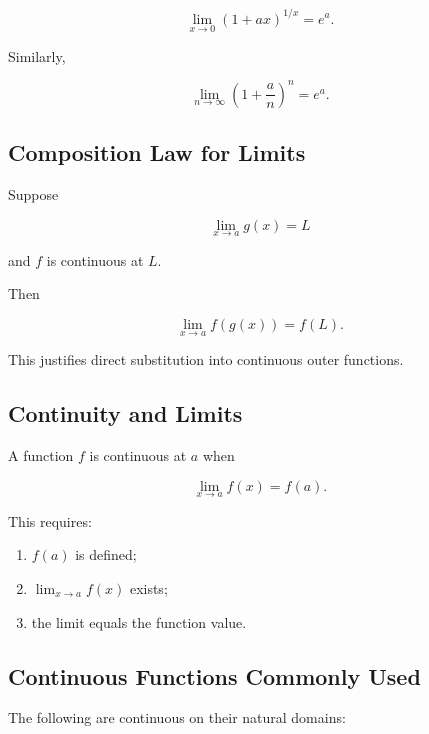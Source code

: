 \[
\boxed{
\lim_{x\to0}
(1+ax)^{1/x}
=
e^a.
}
\]

Similarly,

\[
\boxed{
\lim_{n\to\infty}
\left(
1+\frac{a}{n}
\right)^n
=
e^a.
}
\]

\subsection{Composition Law for Limits}
\label{subsec:composition-limit-law}

Suppose

\[
\lim_{x\to a}g(x)=L
\]

and \(f\) is continuous at \(L\).

Then

\[
\boxed{
\lim_{x\to a}
f(g(x))
=
f(L).
}
\]

This justifies direct substitution into continuous outer functions.

\subsection{Continuity and Limits}
\label{subsec:continuity-limit-reference}

A function \(f\) is continuous at \(a\) when

\[
\boxed{
\lim_{x\to a}f(x)
=
f(a).
}
\]

This requires:

\begin{enumerate}
    \item \(f(a)\) is defined;
    \item \(\lim_{x\to a}f(x)\) exists;
    \item the limit equals the function value.
\end{enumerate}

\subsection{Continuous Functions Commonly Used}
\label{subsec:common-continuous-functions-reference}

The following are continuous on their natural domains:


